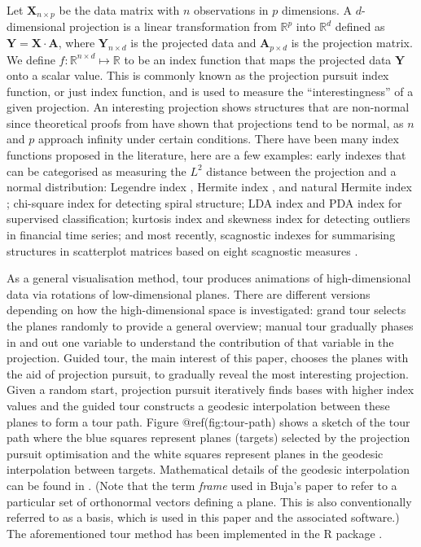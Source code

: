 Let \(\mathbf{X}_{n \times p}\) be the data matrix with \(n\)
observations in \(p\) dimensions. A \(d\)-dimensional projection is a
linear transformation from \(\mathbb{R}^p\) into \(\mathbb{R}^d\)
defined as \(\mathbf{Y} = \mathbf{X} \cdot \mathbf{A}\), where
\(\mathbf{Y}_{n \times d}\) is the projected data and
\(\mathbf{A}_{p\times d}\) is the projection matrix. We define
\(f: \mathbb{R}^{n \times d} \mapsto \mathbb{R}\) to be an index
function that maps the projected data \(\mathbf{Y}\) onto a scalar
value. This is commonly known as the projection pursuit index function,
or just index function, and is used to measure the ``interestingness''
of a given projection. An interesting projection shows structures that
are non-normal since theoretical proofs from
\citet{diaconis1984asymptotics} have shown that projections tend to be
normal, as \(n\) and \(p\) approach infinity under certain conditions.
There have been many index functions proposed in the literature, here
are a few examples: early indexes that can be categorised as measuring
the \(L^2\) distance between the projection and a normal distribution:
Legendre index \citep{friedman1974projection}, Hermite index
\citep{hall1989polynomial}, and natural Hermite index
\citep{cook1993projection}; chi-square index \citep{posse1995projection}
for detecting spiral structure; LDA index \citep{lee2005projection} and
PDA \citep{lee2010projection} index for supervised classification;
kurtosis index \citep{Loperfido2020} and skewness index
\citep{Loperfido2018} for detecting outliers in financial time series;
and most recently, scagnostic indexes \citep{laa2020using} for
summarising structures in scatterplot matrices based on eight scagnostic
measures \citep{scag, WW08}.

As a general visualisation method, tour produces animations of
high-dimensional data via rotations of low-dimensional planes. There are
different versions depending on how the high-dimensional space is
investigated: grand tour \citep{cook2008grand} selects the planes
randomly to provide a general overview; manual tour
\citep{cook1997manual} gradually phases in and out one variable to
understand the contribution of that variable in the projection. Guided
tour, the main interest of this paper, chooses the planes with the aid
of projection pursuit, to gradually reveal the most interesting
projection. Given a random start, projection pursuit iteratively finds
bases with higher index values and the guided tour constructs a geodesic
interpolation between these planes to form a tour path. Figure
@ref(fig:tour-path) shows a sketch of the tour path where the blue
squares represent planes (targets) selected by the projection pursuit
optimisation and the white squares represent planes in the geodesic
interpolation between targets. Mathematical details of the geodesic
interpolation can be found in \citet{buja2005computational}. (Note that
the term \emph{frame} used in Buja's paper to refer to a particular set
of orthonormal vectors defining a plane. This is also conventionally
referred to as a basis, which is used in this paper and the associated
software.) The aforementioned tour method has been implemented in the R
package  \citep{tourr}.

